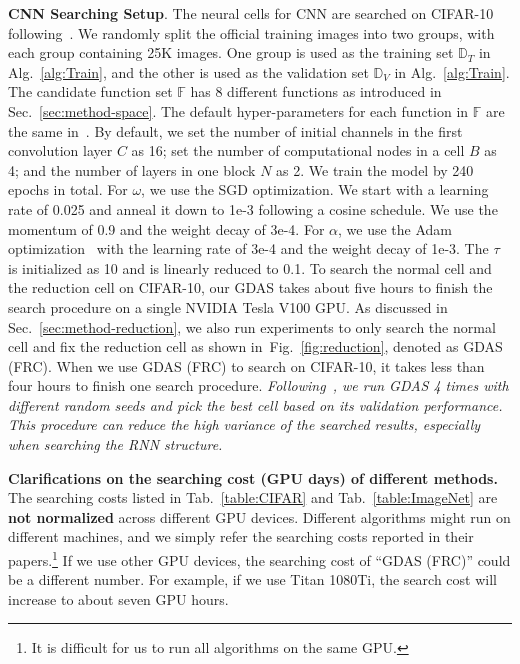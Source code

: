 \documentclass[10pt,twocolumn,letterpaper]{article}
\def\Figref#1{Fig.~\ref{#1}}
\def\Secref#1{Sec.~\ref{#1}}
\def\Algref#1{Alg.~\ref{#1}}
\def\Tabref#1{Tab.~\ref{#1}}
\def\sD{{\mathbb{D}}}
\def\sF{{\mathbb{F}}}
\begin{document}
\textbf{CNN Searching Setup}.
The neural cells for CNN are searched on CIFAR-10 following~\cite{zoph2017NAS,Zoph_2018_CVPR,Liu_2018_ECCV,pmlr-v80-pham18a}.
We randomly split the official training images into two groups, with each group containing 25K images. One group is used as the training set $\sD_{T}$ in \Algref{alg:Train}, and the other is used as the validation set $\sD_{V}$ in \Algref{alg:Train}.
The candidate function set $\sF$ has 8 different functions as introduced in \Secref{sec:method-space}.
The default hyper-parameters for each function in $\sF$ are the same in~\cite{liu2019darts,Zoph_2018_CVPR,Liu_2018_ECCV}.
By default, we set the number of initial channels in the first convolution layer $C$ as 16; set the number of computational nodes in a cell $B$ as 4; and the number of layers in one block $N$ as 2.
We train the model by 240 epochs in total.
For $\omega$, we use the SGD optimization. We start with a learning rate of 0.025 and anneal it down to 1e-3 following a cosine schedule. We use the momentum of 0.9 and the weight decay of 3e-4.
For $\alpha$, we use the Adam optimization~\cite{kingma2015adam} with the learning rate of 3e-4 and the weight decay of 1e-3.
The $\tau$ is initialized as 10 and is linearly reduced to {0.1}.
To search the normal cell and the reduction cell on CIFAR-10, our GDAS takes about five hours to finish the search procedure on a single NVIDIA Tesla V100 GPU.
As discussed in \Secref{sec:method-reduction}, we also run experiments to only search the normal cell and fix the reduction cell as shown in~\Figref{fig:reduction}, denoted as GDAS (FRC).
When we use GDAS (FRC) to search on CIFAR-10, it takes less than four hours to finish one search procedure.
\textit{Following~\cite{liu2019darts}, we run GDAS 4 times with different random seeds and pick the best cell based on its validation performance. This procedure can reduce the high variance of the searched results, especially when searching the RNN structure.}


\textbf{Clarifications on the searching cost (GPU days) of different methods.}
The searching costs listed in \Tabref{table:CIFAR} and \Tabref{table:ImageNet} are \textbf{not normalized} across different GPU devices. Different algorithms might run on different machines, and we simply refer the searching costs reported in their papers.\footnote{It is difficult for us to run all algorithms on the same GPU.}
If we use other GPU devices, the searching cost of ``GDAS (FRC)'' could be a different number. For example, if we use Titan 1080Ti, the search cost will increase to about seven GPU hours. 
\end{document}
